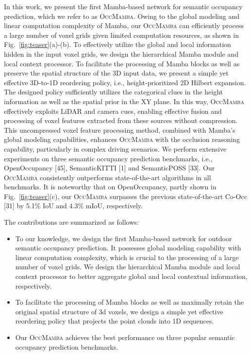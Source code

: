 \documentclass[10pt,twocolumn,letterpaper]{article}
\newcommand{\methodname}{\textsc{OccMamba}}
\begin{document}
In this work, we present the first Mamba-based network for semantic occupancy prediction, which we refer to as \methodname{}. Owing to the global modeling and linear computation complexity of Mamba, our \methodname{} can efficiently process a large number of voxel grids given limited computation resources, as shown in Fig.~\ref{fig:teaser}(a)-(b). To effectively utilize the global and local information hidden in the input voxel grids, we design the hierarchical Mamba module and local context processor. To facilitate the processing of Mamba blocks as well as preserve the spatial structure of the 3D input data, we present a simple yet effective 3D-to-1D reordering policy, i.e., height-prioritized 2D Hilbert expansion. The designed policy sufficiently utilizes the categorical clues in the height information as well as the spatial prior in the XY plane. In this way, \methodname{} effectively exploits LiDAR and camera cues, enabling effective fusion and processing of voxel features extracted from these sources without compression. This uncompressed voxel feature processing method, combined with Mamba's global modeling capabilities, enhances \methodname{} with the occlusion reasoning capability, particularly in complex driving scenarios. We perform extensive experiments on three semantic occupancy prediction benchmarks, i.e., OpenOccupancy [45], SemanticKITTI [1] and SemanticPOSS [33]. Our \methodname{} consistently outperforms state-of-the-art algorithms in all benchmarks. It is noteworthy that on OpenOccupancy, partly shown in Fig.~\ref{fig:teaser}(c), our \methodname{} surpasses the previous state-of-the-art Co-Occ [31] by 5.1\% IoU and 4.3\% mIoU, respectively.

The contributions are summarized as follows:
\begin{itemize}
  \item To our knowledge, we design the first Mamba-based network for outdoor semantic occupancy prediction. It possesses global modeling capability with linear computation complexity, which is crucial to the processing of a large number of voxel grids. We design the hierarchical Mamba module and local context processor to better aggregate global and local contextual information, respectively.
  \item To facilitate the processing of Mamba blocks as well as maximally retain the original spatial structure of 3d voxels, we design a simple yet effective reordering policy that projects the point clouds into 1D sequences.
  \item Our \methodname{} achieves the best performance on three popular semantic occupancy prediction benchmarks.
\end{itemize}
\end{document}
